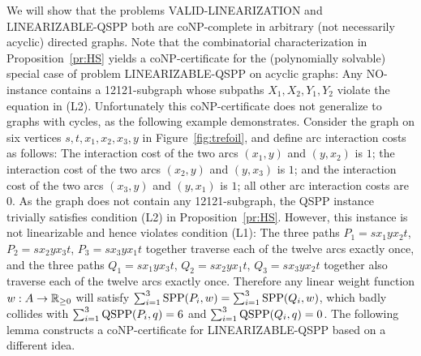 \documentclass[runningheads]{llncs}
\begin{document}
We will show that the problems VALID-LINEARIZATION and LI\-NEA\-RIZ\-ABLE-QSPP
both are coNP-complete in arbitrary (not necessarily acyclic) directed graphs.
Note that the combinatorial characterization in Proposition~\ref{pr:HS} yields a coNP-certificate 
for the (polynomially solvable) special case of problem LINEARIZABLE-QSPP on acyclic graphs:
Any NO-instance contains a 12121-subgraph whose subpaths $X_1,X_2,Y_1,Y_2$ violate the equation in (L2).
Unfortunately this coNP-certificate does not generalize to graphs with cycles, as the 
following example demonstrates.
Consider the graph on six vertices $s,t,x_1,x_2,x_3,y$ in Figure~\ref{fig:trefoil}, 
and define arc interaction costs as follows:
The interaction cost of the two arcs $(x_1,y)$ and $(y,x_2)$ is $1$; 
the interaction cost of the two arcs $(x_2,y)$ and $(y,x_3)$ is $1$; and
the interaction cost of the two arcs $(x_3,y)$ and $(y,x_1)$ is $1$;
all other arc interaction costs are~$0$.
As the graph does not contain any 12121-subgraph, the QSPP instance trivially satisfies 
condition (L2) in Proposition~\ref{pr:HS}.
However, this instance is not linearizable and hence violates condition (L1):
The three paths 
$P_1=sx_1yx_2t$, 
$P_2=sx_2yx_3t$,
$P_3=sx_3yx_1t$
together traverse each of the twelve arcs exactly once, and the three paths
$Q_1=sx_1yx_3t$,
$Q_2=sx_2yx_1t$,
$Q_3=sx_3yx_2t$
together also traverse each of the twelve arcs exactly once.
Therefore any linear weight function $w:A\to{\mathbb{R}_{\ge0}}$ will satisfy $\sum_{i=1}^3\text{SPP}(P_i,w)=\sum_{i=1}^3\text{SPP}(Q_i,w)$,
which badly collides with $\sum_{i=1}^3\text{QSPP}(P_i,q)=6$ and $\sum_{i=1}^3\text{QSPP}(Q_i,q)=0$.
The following lemma constructs a coNP-certificate for LINEARIZABLE-QSPP based on a 
different idea.
\end{document}
